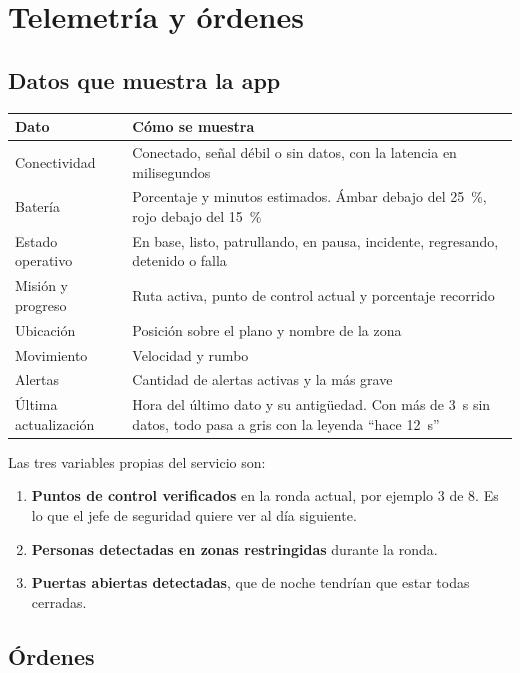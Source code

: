 \section{Telemetría y órdenes}
\label{sec:telemetria}

\subsection{Datos que muestra la app}

\begin{table}[H]
\centering\small
\begin{tabularx}{\textwidth}{@{}l L@{}}
\toprule
\textbf{Dato} & \textbf{Cómo se muestra} \\
\midrule
Conectividad & Conectado, señal débil o sin datos, con la latencia en milisegundos \\
Batería & Porcentaje y minutos estimados. Ámbar debajo del 25~\%, rojo debajo del 15~\% \\
Estado operativo & En base, listo, patrullando, en pausa, incidente, regresando, detenido o falla \\
Misión y progreso & Ruta activa, punto de control actual y porcentaje recorrido \\
Ubicación & Posición sobre el plano y nombre de la zona \\
Movimiento & Velocidad y rumbo \\
Alertas & Cantidad de alertas activas y la más grave \\
Última actualización & Hora del último dato y su antigüedad. Con más de 3~s sin datos, todo pasa a gris con la leyenda ``hace 12~s'' \\
\bottomrule
\end{tabularx}
\end{table}

Las tres variables propias del servicio son:

\begin{enumerate}
  \item \textbf{Puntos de control verificados} en la ronda actual, por ejemplo 3 de 8. Es lo que el jefe de seguridad quiere ver al día siguiente.
  \item \textbf{Personas detectadas en zonas restringidas} durante la ronda.
  \item \textbf{Puertas abiertas detectadas}, que de noche tendrían que estar todas cerradas.
\end{enumerate}

\subsection{Órdenes}

